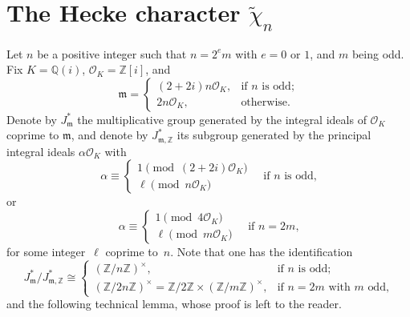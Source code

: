 \documentclass[11pt, reqno]{amsart}
\theoremstyle{plain}
\theoremstyle{definition}
\numberwithin{equation}{section}
\begin{document}
\section{The Hecke character $\tilde{\chi}_{n}$}\label{charchi}

Let $n$ be a positive integer such that $n=2^{e}m$ with $e=0$ or $1$, and $m$ being odd. Fix $K=\mathbb{Q}(i)$, $\mathcal{O}_{K}=\mathbb{Z}[i]$, and $$
\mathfrak{m}=\begin{cases}
    (2+2i)n\mathcal{O}_{K},&\mbox{if $n$ is odd;}\\
    2n\mathcal{O}_{K},&\mbox{otherwise.}
\end{cases}
$$
Denote by $J_{\mathfrak{m}}^{*}$ the multiplicative group generated by the integral ideals of $\mathcal{O}_{K}$ coprime to $\mathfrak{m}$, and denote by $J_{\mathfrak{m},\mathbb{Z}}^{*}$ its subgroup generated by the principal integral ideals $\alpha\mathcal{O}_{K}$ with 
$$
\alpha\equiv \begin{cases}
    1\pmod{(2+2i)\mathcal{O}_{K}}\\
    \ell\pmod{n\mathcal{O}_{K}}
\end{cases}\quad\mbox{if $n$ is odd,}
$$
or
$$
\alpha\equiv \begin{cases}
    1\pmod{4\mathcal{O}_{K}}\\
    \ell\pmod{m\mathcal{O}_{K}}
\end{cases}\quad\mbox{if $n=2m$,}
$$
for some integer~$\ell$ coprime to~$n$. Note that one has the identification
$$
J_{\mathfrak{m}}^{*}/J_{\mathfrak{m},\mathbb{Z}}^{*}\cong\begin{cases}
(\mathbb{Z}/n\mathbb{Z})^{\times},&\mbox{if $n$ is odd;}\\
(\mathbb{Z}/2n\mathbb{Z})^{\times}=\mathbb{Z}/2\mathbb{Z}\times(\mathbb{Z}/m\mathbb{Z})^{\times},&\mbox{if $n=2m$ with $m$ odd,}
\end{cases}
$$
and the following technical lemma, whose proof is left to the reader.
\end{document}
